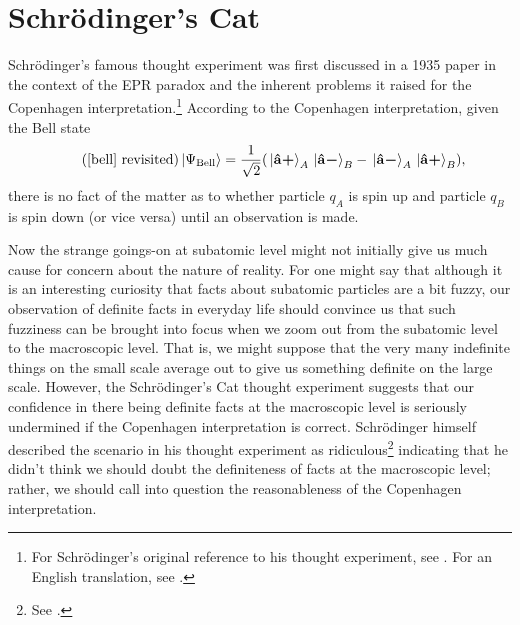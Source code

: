 
\section{Schr\"{o}dinger's Cat\label{SchrondingersCat}}
Schr\"{o}dinger's famous thought experiment was first discussed in a 1935 paper in the context of the EPR paradox and the inherent problems it raised for the Copenhagen interpretation.\footnote{For Schr\"{o}dinger's original reference to his thought experiment, see \cite{SchrondingerOrig}. For an English translation, see \cite{SchrondingerEnglish}.} According to the Copenhagen interpretation, given the Bell state 
\begin{equation}\tag{\ref{bell} revisited}
    \ket*{\Psi_{\text{Bell}}}=\frac{1}{\sqrt{2}}(\ket*{\uvbp{a}}_A\ket*{\uvbm{a}}_B-\ket*{\uvbm{a}}_A\ket*{\uvbp{a}}_B),
\end{equation}
there is no fact of the matter as to whether particle $q_A$ is spin up and particle $q_B$ is spin down (or vice versa) until an observation is made. 

Now the strange goings-on at subatomic level might not initially give us much cause for concern about the nature of reality. For one might say that although it is an interesting curiosity that facts about subatomic particles are a bit fuzzy, our observation of definite facts in everyday life should convince us that such fuzziness can be brought into focus when we zoom out from the subatomic level to the macroscopic level. That is, we might suppose that the very many indefinite things on the small scale average out to give us something definite on the large scale. However, the Schr\"{o}dinger's Cat thought experiment suggests that our confidence in there being definite facts at the macroscopic level is seriously undermined if the Copenhagen interpretation is correct. Schr\"{o}dinger himself described the scenario in his thought experiment as ridiculous\footnote{See \cite[p. 328]{SchrondingerEnglish}.} indicating that he didn't think we should doubt the definiteness of facts at the macroscopic level; rather, we should call into question the reasonableness of the Copenhagen interpretation. 

